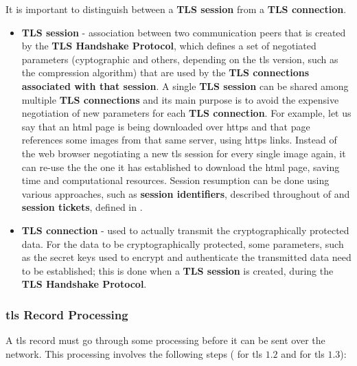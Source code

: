 \documentclass{llncs}
\begin{document}
It is important to distinguish between a \textbf{TLS session} from a \textbf{TLS connection}.
\begin{itemize}
  \item \textbf{TLS session} - association between two communication peers that is
  created by the \textbf{TLS Handshake Protocol}, which defines a set of negotiated parameters
  (cyptographic and others, depending on the \gls{tls} version, such as
  the compression algorithm) that are used by the \textbf{TLS connections associated
  with that session}. A single \textbf{TLS session} can be shared among multiple
  \textbf{TLS connections} and its main purpose is to avoid the expensive negotiation
  of new parameters for each \textbf{TLS connection}. For example, let us say
  that an \gls{html} page is being downloaded over \gls{https} and that page references some images from that same server, using \gls{https} links. Instead of the web browser negotiating a new \gls{tls} session for every single image again, it can re-use the the
  one it has established to download the \gls{html} page,
  saving time and computational resources. Session resumption can be done using various
  approaches, such as \textbf{session identifiers}, described throughout 
  of \cite{RFC5246} and \textbf{session tickets}, defined in
  \cite{RFC5077}.
  \item \textbf{TLS connection} - used to actually transmit the cryptographically
  protected data. For the data to be cryptographically protected, some parameters,
  such as the secret keys used to encrypt and authenticate the transmitted
  data need to be established; this is done when a \textbf{TLS session} is created,
  during the \textbf{TLS Handshake Protocol}.
\end{itemize}

\subsubsection{\gls{tls} Record Processing}

A \gls{tls} record must go through some processing before it can be sent over the network.
This processing involves the following steps ( for \gls{tls} $1.2$ and  for \gls{tls} $1.3$):
\end{document}
